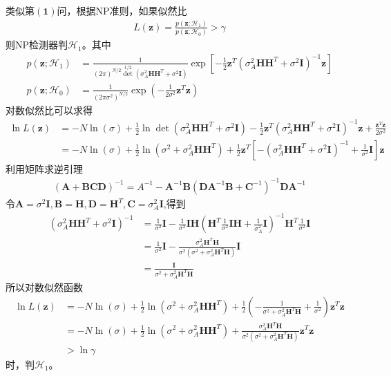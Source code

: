\documentclass[fontset=windows]{article}
\numberwithin{figure}{section}
\begin{document}
类似第\(\mathbf{(1)}\)问，根据NP准则，如果似然比
\begin{align*}
    L(\mathbf{z})=\frac{p(\mathbf{z};\mathcal{H}_1)}{p(\mathbf{z};\mathcal{H}_0)}>\gamma
\end{align*}
则NP检测器判\(\mathcal{H}_1\)。其中
\begin{align*}
    p(\mathbf{z};\mathcal{H}_1)
     & =\frac{1}{(2\pi)^{N/2} \det^{1/2}(\sigma^2_A\mathbf{HH}^T+\sigma^2\mathbf{I})}
    \exp\left[-\frac{1}{2}\mathbf{z}^T(\sigma^2_A\mathbf{HH}^T+\sigma^2\mathbf{I})^{-1}\mathbf{z} \right] \\
    p(\mathbf{z};\mathcal{H}_0)
     & =\frac{1}{(2\pi\sigma^2)^{N/2}}\exp
    \left(-\frac{1}{2\sigma^2}\mathbf{z}^T\mathbf{z} \right)
\end{align*}
对数似然比可以求得
\begin{align*}
    \ln L(\mathbf{z})
     & =-N\ln(\sigma)+\frac{1}{2}\ln \det(\sigma^2_A\mathbf{HH}^T+\sigma^2\mathbf{I})
    -\frac{1}{2}\mathbf{z}^T(\sigma^2_A\mathbf{HH}^T+\sigma^2\mathbf{I})^{-1}\mathbf{z}
    +\frac{\mathbf{z}^T\mathbf{z}}{{2\sigma^2}}                                       \\
     & =-N\ln(\sigma)+\frac{1}{2}\ln(\sigma^2+\sigma^2_A\mathbf{HH}^T)
    +\frac{1}{2}\mathbf{z}^T\left[-(\sigma^2_A\mathbf{HH}^T+\sigma^2\mathbf{I})^{-1}+\frac{1}{\sigma^2}\mathbf{I}\right]\mathbf{z}
\end{align*}
利用矩阵求逆引理
\begin{align*}
    (\mathbf{A}+\mathbf{BCD})^{-1}=A^{-1}-\mathbf{A}^{-1}\mathbf{B}(\mathbf{DA}^{-1}\mathbf{B}+\mathbf{C}^{-1})^{-1}\mathbf{DA}^{-1}
\end{align*}
令\(\mathbf{A}=\sigma^2\mathbf{I},\mathbf{B}=\mathbf{H},\mathbf{D}=\mathbf{H}^T,\mathbf{C}=\sigma^2_A\mathbf{I}\),得到
\begin{align*}
    (\sigma^2_A\mathbf{HH}^T+\sigma^2\mathbf{I})^{-1}
     & =\frac{1}{\sigma^2}\mathbf{I}-
    \frac{1}{\sigma^2}\mathbf{IH}(\mathbf{H}^T\frac{1}{\sigma^2}\mathbf{IH}+\frac{1}{\sigma^2_A}\mathbf{I})^{-1}
    \mathbf{H}^T\frac{1}{\sigma^2}\mathbf{I}                                                                                                \\
     & =\frac{1}{\sigma^2}\mathbf{I}-\frac{\sigma^2_A\mathbf{H}^T\mathbf{H}}{\sigma^2(\sigma^2+\sigma^2_A\mathbf{H}^T\mathbf{H})}\mathbf{I} \\
     & =\frac{\mathbf{I}}{\sigma^2+\sigma^2_A\mathbf{H}^T\mathbf{H}}
\end{align*}
所以对数似然函数
\begin{align*}
    \ln L(\mathbf{z})
     & =-N\ln(\sigma)+\frac{1}{2}\ln(\sigma^2+\sigma^2_A\mathbf{HH}^T)
    +\frac{1}{2}(-\frac{1}{\sigma^2+\sigma^2_A\mathbf{H}^T\mathbf{H}}+\frac{1}{\sigma^2})\mathbf{z}^T\mathbf{z}        \\
     & =-N\ln(\sigma)+\frac{1}{2}\ln(\sigma^2+\sigma^2_A\mathbf{HH}^T)+
    \frac{\sigma^2_A\mathbf{H}^T\mathbf{H}}{\sigma^2(\sigma^2+\sigma^2_A\mathbf{H}^T\mathbf{H})}\mathbf{z}^T\mathbf{z} \\
     & >\ln \gamma
\end{align*}
时，判\(\mathcal{H}_1\)。
\end{document}
